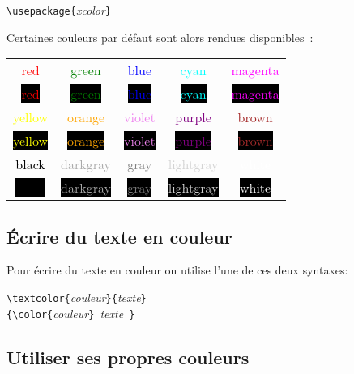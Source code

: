 \documentclass[a4paper, 11pt]{article}
\begin{document}
        \begin{center}
            \verb!\usepackage{!\textit{xcolor}\verb!}!
        \end{center}

        Certaines couleurs par défaut sont alors rendues disponibles~:

        \renewcommand{\c}[1]{\textcolor{#1}{#1}}
        \newcommand{\bc}[1]{\colorbox{black}{\c{#1}}}

        \begin{center}
            \sffamily\bfseries
            \begin{tabular}{|*{5}{c|}}
                \hline
                \c{red} & \c{green} & \c{blue} & \c{cyan} & \c{magenta} \\
                \bc{red} & \bc{green} & \bc{blue} & \bc{cyan} & \bc{magenta} \\
                \hline
                \c{yellow} & \c{orange} & \c{violet} & \c{purple} & \c{brown} \\
                \bc{yellow} & \bc{orange} & \bc{violet} & \bc{purple} & \bc{brown} \\
                \hline
                \c{black} & \c{darkgray} & \c{gray} & \c{lightgray} & \c{white} \\
                \bc{black} & \bc{darkgray} & \bc{gray} & \bc{lightgray} & \bc{white} \\
                \hline
            \end{tabular}
        \end{center}

\clearpage

        \subsection{Écrire du texte en couleur}

            Pour écrire du texte en couleur on utilise l'une de ces deux syntaxes:

            \begin{center}
                \verb!\textcolor{!\textit{couleur}\verb!}{!\textit{texte}\verb!}! \\
                \verb!{\color{!\textit{couleur}\verb!} !\textit{texte}\verb! }!
            \end{center}

        \subsection{Utiliser ses propres couleurs}
\end{document}
